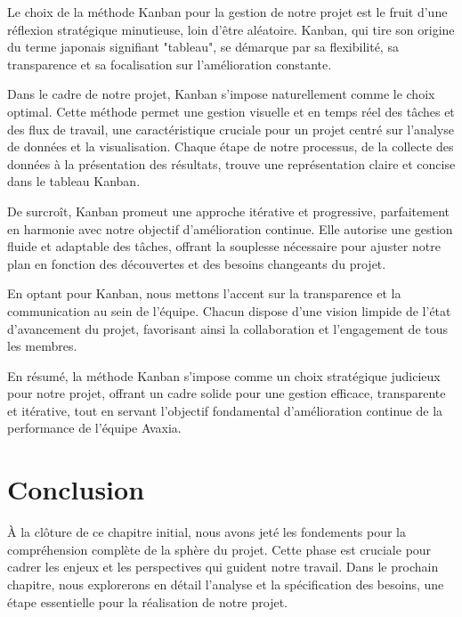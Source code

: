 \par Le choix de la méthode Kanban pour la gestion de notre projet est le fruit d'une réflexion stratégique minutieuse, loin d'être aléatoire. Kanban, qui tire son origine du terme japonais signifiant "tableau", se démarque par sa flexibilité, sa transparence et sa focalisation sur l'amélioration constante.

\par Dans le cadre de notre projet, Kanban s'impose naturellement comme le choix optimal. 
Cette méthode permet une gestion visuelle et en temps réel des tâches et des flux de travail, une caractéristique cruciale pour un projet centré sur l'analyse de données et la visualisation.
 Chaque étape de notre processus, de la collecte des données à la présentation des résultats, trouve une représentation claire et concise dans le tableau Kanban.

\par De surcroît, Kanban promeut une approche itérative et progressive, parfaitement en harmonie avec notre objectif d'amélioration continue. 
Elle autorise une gestion fluide et adaptable des tâches, offrant la souplesse nécessaire pour ajuster notre plan en fonction des découvertes et des besoins changeants du projet.

\par En optant pour Kanban, nous mettons l'accent sur la transparence et la communication au sein de l'équipe. 
Chacun dispose d'une vision limpide de l'état d'avancement du projet, favorisant ainsi la collaboration et l'engagement de tous les membres.

\par En résumé, la méthode Kanban s'impose comme un choix stratégique judicieux pour notre projet, offrant un cadre solide pour une gestion efficace, transparente et itérative, tout en servant l'objectif fondamental d'amélioration continue de la performance de l'équipe Avaxia.

\section*{Conclusion}
   À la clôture de ce chapitre initial,
    nous avons jeté les fondements pour la compréhension complète de la sphère du projet. Cette phase est cruciale pour cadrer les enjeux et les perspectives qui guident notre travail. Dans le prochain chapitre, nous explorerons en détail l'analyse et la spécification des besoins, une étape essentielle pour la réalisation de notre projet.